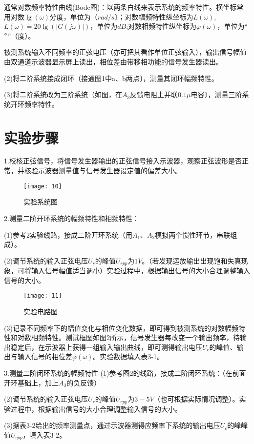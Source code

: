 \documentclass[UTF8,a4paper,10pt]{ctexart}
\begin{document}
	通常对数频率特性曲线(Bode图)：以两条白线来表示系统的频率特性。横坐标常用对数$\lg(\omega)$分度，单位为（$rad/s$〕；对数幅频特性纵坐标为$L(\omega)$,$L(\omega)=20\lg(\left| G(j\omega)\right|)$，单位为$dB$;对数相频特性纵坐标为$\varphi(\omega)$，单位为“$\degree$”（度）。
	
	被测系统输入不同频率的正弦电压（亦可把其看作单位正弦输入），输出信号幅值由双通道示波器显示屏上读出，相位差由带移相功能的信号发生器读出。
	
	(2)将二阶系统接成闭环（接通图1中a、b两点〕，测量其闭环幅频特性。
	
	(3)将二阶系统改为三阶系统（如图，在$A_{3}$反馈电阻上并联$0.1\mu$电容〕，测量三阶系统开环频率特性。
	
	\section{实验步骤}
	1.校核正弦信号，将信号发生器输出的正弦信号接入示波器，观察正弦波形是否正常，并核验示波器测量值与信号发生器设定值的偏差大小。
	\begin{figure}[h]
		\centering
		\texttt{[image: 10]}
		\caption{实验系统图}
	\end{figure}

	2.测量二阶开环系统的幅频特性和相频特性：
	
	(1)参考2实验线路，接成二阶开环系统（用$A_{1}$、$A_{2}$模拟两个惯性环节，串联组成）。
	
	(2)调节系统的输入正弦电压$U_{r}$的峰值$U_{rpp}$为$1V$。（若发现运放输出出现饱和失真现象，可将输入信号幅值适当调小）实验过程中，根据输出信号的大小合理调整输入信号的大小。
	
	\begin{figure}[h]
		\centering
		\texttt{[image: 11]}
		\caption{实验电路图}
	\end{figure}

	(3)记录不同频率下的幅值变化与相位变化数据，即可得到被测系统的对数幅频特性和对数相频特性。测试框图如图2所示，信号发生器每改变一个输出频率，待输出稳定后，在示波器上获得一组输入输出曲线，即可测得输出电压$U_{c}$的峰值、输出与输入信号的相位差$\varphi(\omega)$。实验数据填入表3-1。
	
	3.测量二阶闭环系统的幅频特性
	(1)参考图2的线路，接成二阶闭环系统：（在前面开环基础上，加上$A_{3}$的负反馈）
	
	(2)调节系统的输入正弦电压$U_{r}$的峰值$U_{rpp}$为$3-5V$（也可根据实际情况调整）。实验过程中，根据输出信号的大小合理调整输入信号的大小。
	
	(3)据表3-2给出的频率测量点，通过示波器测得应频率下系统的输出电压$U_{c}$的峰峰值$U_{cpp}$，填入表3-2。
\end{document}
